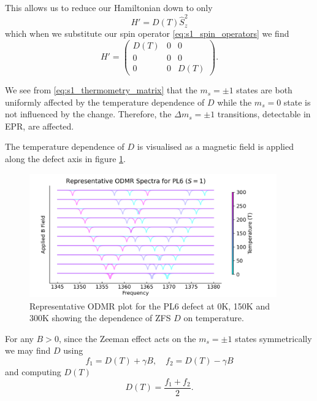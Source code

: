 This allows us to reduce our Hamiltonian down to only
\begin{equation}
	H' = D(T) \hat{S}_z^2
	\label{eq:}
\end{equation}
which when we substitute our spin operator \eqref{eq:s1_spin_operators} we find
\begin{equation}
	H' = \begin{pmatrix}
		D(T) & 0 & 0    \\
		0    & 0 & 0    \\
		0    & 0 & D(T)
	\end{pmatrix}.
	\label{eq:s1_thermometry_matrix}
\end{equation}

We see from \eqref{eq:s1_thermometry_matrix} that the $m_s = \pm 1$ states are both uniformly affected by the temperature dependence of $D$ while the $m_s =0$ state is not influenced by the change. Therefore, the $\Delta m_s = \pm1$ transitions, detectable in EPR, are affected.

The temperature dependence of $D$ is visualised as a magnetic field is applied along the defect axis in figure \ref{fig:s1-temp-dependence}.

\begin{figure}[H]
	\begin{center}
		\includegraphics[width=0.95\textwidth]{figures/ODMR-s1-temp-dependence.png}
	\end{center}
	\caption{Representative ODMR plot for the PL6 defect at 0K, 150K and 300K showing the dependence of ZFS $D$ on temperature.}\label{fig:s1-temp-dependence}
\end{figure}

For any $B > 0$, since the Zeeman effect acts on the $m_s = \pm1$ states symmetrically we may find $D$ using
\begin{equation}
	f_1 = D(T) + \gamma B, \quad f_2 = D(T) - \gamma B
	\label{eq:}
\end{equation}
and computing $D(T)$
\begin{equation}
	D(T) = \frac{f_1 + f_2}{2}.
	\label{eq:average_freq_thermo}
\end{equation}

